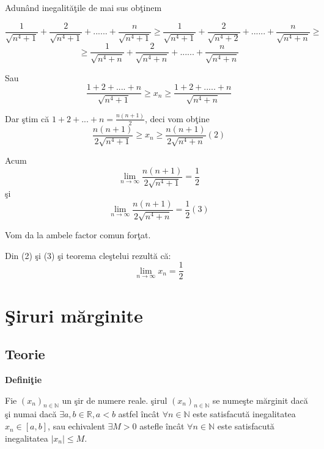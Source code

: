 \documentclass[a4paper,12pt,oneside]{report}
\begin{document}
\begin{enumerate}
Adun\^ and inegalit\u a\c tile de mai sus ob\c tinem 

\begin{displaymath}
  \frac{1}{\sqrt{n^{4}+1}}+ \frac{2}{\sqrt{n^{4}+1}}+......+ \frac{n}{\sqrt{n^{4}+1}} \geq \frac{1}{\sqrt{n^{4}+1}}+ \frac{2}{\sqrt{n^{4}+2}}+......+ \frac{n}{\sqrt{n^{4}+n}}\geq
\end{displaymath}
\begin{displaymath}
  \geq\frac{1}{\sqrt{n^{4}+n}}+ \frac{2}{\sqrt{n^{4}+n}}+......+ \frac{n}{\sqrt{n^{4}+n}}
\end{displaymath}


Sau
\begin{displaymath}
  \frac{1+2+....+n}{\sqrt{n^{4}+1}}\geq x_{n}\geq \frac{1+2+.....+n}{\sqrt{n^{4}+n}}
\end{displaymath}


Dar \c stim c\u a \(1+2+...+n = \frac{n(n+1)}{2}\), deci vom ob\c tine 
\begin{displaymath}
  \frac{n(n+1)}{2\sqrt{n^{4}+1}}\geq x_{n}\geq \frac{n(n+1)}{2\sqrt{n^{4}+n}} (2)
\end{displaymath}

Acum 
\begin{displaymath}
  \lim_{n \to \infty }\frac{n(n+1)}{2\sqrt{n^{4}+1}}=\frac{1}{2}  
\end{displaymath}
\c si 
\begin{displaymath}
    \lim_{n \to \infty }\frac{n(n+1)}{2\sqrt{n^{4}+n}}=\frac{1}{2} (3)
\end{displaymath}

Vom da la ambele factor comun for\c tat. 

Din (2) \c si (3) \c si teorema cle\c stelui rezult\u a c\u a:
\begin{displaymath}
  \lim_{n \to \infty }x_{n}=\frac{1}{2}
\end{displaymath}
\end{enumerate}


\chapter{\c Siruri m\u arginite}

\section{Teorie}

\textbf{Defini\c tie}

Fie \((x_{n})_{n\in \mathbb{N}}\) un \c sir de numere reale. \c sirul \((x_{n})_{n\in \mathbb{N}}\) se nume\c ste m\u arginit dac\u a \c si numai dac\u a \(\exists  a, b \in \mathbb{R}, a< b\) astfel \^ inc\^ at \(\forall n\in \mathbb{N}\) este satisfacut\u a inegalitatea \(x_{n}\in \left [ a,b \right ]\), sau echivalent \(\exists M> 0\) astefle \^ inc\^ at \(\forall  n\in \mathbb{N}\) este satisfacut\u a inegalitatea \(\left | x_{n} \right |\leq M\).
\end{document}
